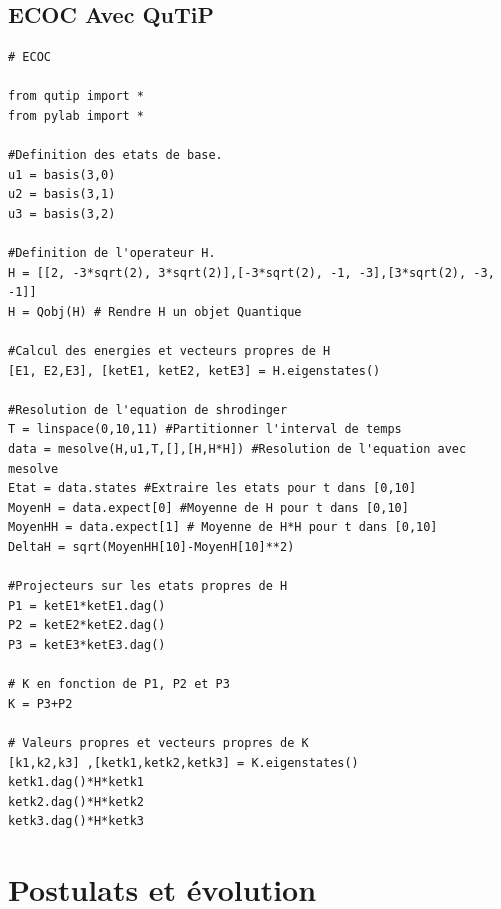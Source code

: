 \documentclass[a4paper,12pt]{book}
\numberwithin{equation}{section}
\begin{document}
\subsection{ECOC Avec QuTiP}
\begin{lstlisting}
# ECOC

from qutip import *
from pylab import *

#Definition des etats de base.
u1 = basis(3,0)
u2 = basis(3,1)
u3 = basis(3,2)

#Definition de l'operateur H.
H = [[2, -3*sqrt(2), 3*sqrt(2)],[-3*sqrt(2), -1, -3],[3*sqrt(2), -3, -1]]
H = Qobj(H) # Rendre H un objet Quantique

#Calcul des energies et vecteurs propres de H
[E1, E2,E3], [ketE1, ketE2, ketE3] = H.eigenstates()

#Resolution de l'equation de shrodinger
T = linspace(0,10,11) #Partitionner l'interval de temps
data = mesolve(H,u1,T,[],[H,H*H]) #Resolution de l'equation avec mesolve
Etat = data.states #Extraire les etats pour t dans [0,10]
MoyenH = data.expect[0] #Moyenne de H pour t dans [0,10]
MoyenHH = data.expect[1] # Moyenne de H*H pour t dans [0,10]
DeltaH = sqrt(MoyenHH[10]-MoyenH[10]**2)

#Projecteurs sur les etats propres de H
P1 = ketE1*ketE1.dag()
P2 = ketE2*ketE2.dag()
P3 = ketE3*ketE3.dag()

# K en fonction de P1, P2 et P3
K = P3+P2

# Valeurs propres et vecteurs propres de K
[k1,k2,k3] ,[ketk1,ketk2,ketk3] = K.eigenstates()
ketk1.dag()*H*ketk1
ketk2.dag()*H*ketk2
ketk3.dag()*H*ketk3

\end{lstlisting}

\section{Postulats et évolution}
\end{document}
